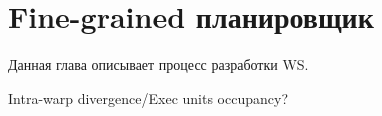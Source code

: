 \section{Fine-grained планировщик}

Данная глава описывает процесс разработки WS.

Intra-warp divergence/Exec units occupancy?



